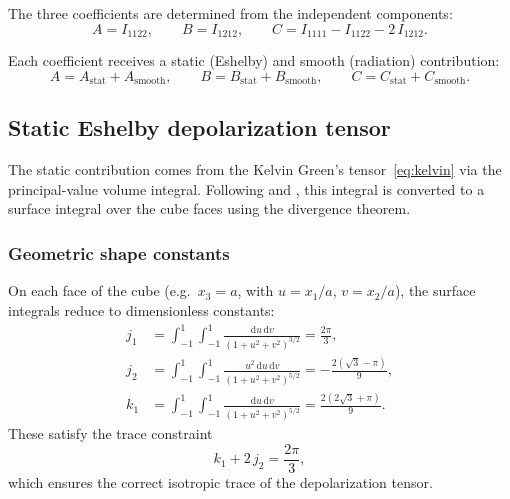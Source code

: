 \documentclass[11pt,a4paper]{article}
\newcommand{\dd}{\mathrm{d}}
\begin{document}
The three coefficients are determined from the independent
components:
\begin{equation}
  A = I_{1122}, \qquad
  B = I_{1212}, \qquad
  C = I_{1111} - I_{1122} - 2\,I_{1212}.
  \label{eq:ABC_from_I}
\end{equation}

Each coefficient receives a static (Eshelby) and smooth (radiation)
contribution:
\begin{equation}
  A = A_\text{stat} + A_\text{smooth}, \qquad
  B = B_\text{stat} + B_\text{smooth}, \qquad
  C = C_\text{stat} + C_\text{smooth}.
  \label{eq:split}
\end{equation}

\subsection{Static Eshelby depolarization tensor}
\label{sec:eshelby}

The static contribution comes from the Kelvin Green's
tensor~\eqref{eq:kelvin} via the principal-value volume
integral. Following \citet{Eshelby1957} and \citet{Mura1987},
this integral is converted to a surface integral over the
cube faces using the divergence theorem.

\subsubsection{Geometric shape constants}

On each face of the cube (e.g.\ $x_3 = a$, with $u = x_1/a$,
$v = x_2/a$), the surface integrals reduce to dimensionless
constants:
\begin{align}
  j_1 &= \int_{-1}^{1}\!\!\int_{-1}^{1}
    \frac{\dd u\,\dd v}{(1 + u^2 + v^2)^{3/2}}
  = \frac{2\pi}{3}, \label{eq:j1} \\[6pt]
  j_2 &= \int_{-1}^{1}\!\!\int_{-1}^{1}
    \frac{u^2\,\dd u\,\dd v}{(1 + u^2 + v^2)^{5/2}}
  = -\frac{2(\sqrt{3} - \pi)}{9}, \label{eq:j2} \\[6pt]
  k_1 &= \int_{-1}^{1}\!\!\int_{-1}^{1}
    \frac{\dd u\,\dd v}{(1 + u^2 + v^2)^{5/2}}
  = \frac{2(2\sqrt{3} + \pi)}{9}. \label{eq:k1}
\end{align}
These satisfy the trace constraint
\begin{equation}
  \boxed{k_1 + 2\,j_2 = \frac{2\pi}{3},}
  \label{eq:trace}
\end{equation}
which ensures the correct isotropic trace of the depolarization
tensor.
\end{document}
